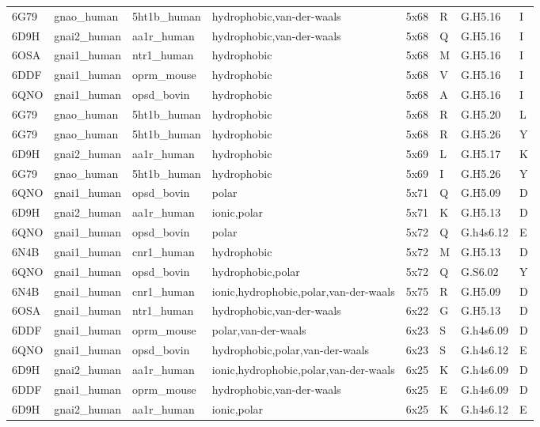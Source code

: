 \begin{landscape}
\begin{longtable}{llllllll}
6G79 & gnao\_human & 5ht1b\_human & hydrophobic,van-der-waals & 5x68 & R & G.H5.16 & I\\
6D9H & gnai2\_human & aa1r\_human & hydrophobic,van-der-waals & 5x68 & Q & G.H5.16 & I\\
\addlinespace
6OSA & gnai1\_human & ntr1\_human & hydrophobic & 5x68 & M & G.H5.16 & I\\
6DDF & gnai1\_human & oprm\_mouse & hydrophobic & 5x68 & V & G.H5.16 & I\\
6QNO & gnai1\_human & opsd\_bovin & hydrophobic & 5x68 & A & G.H5.16 & I\\
6G79 & gnao\_human & 5ht1b\_human & hydrophobic & 5x68 & R & G.H5.20 & L\\
6G79 & gnao\_human & 5ht1b\_human & hydrophobic & 5x68 & R & G.H5.26 & Y\\
\addlinespace
6D9H & gnai2\_human & aa1r\_human & hydrophobic & 5x69 & L & G.H5.17 & K\\
6G79 & gnao\_human & 5ht1b\_human & hydrophobic & 5x69 & I & G.H5.26 & Y\\
6QNO & gnai1\_human & opsd\_bovin & polar & 5x71 & Q & G.H5.09 & D\\
6D9H & gnai2\_human & aa1r\_human & ionic,polar & 5x71 & K & G.H5.13 & D\\
6QNO & gnai1\_human & opsd\_bovin & polar & 5x72 & Q & G.h4s6.12 & E\\
\addlinespace
6N4B & gnai1\_human & cnr1\_human & hydrophobic & 5x72 & M & G.H5.13 & D\\
6QNO & gnai1\_human & opsd\_bovin & hydrophobic,polar & 5x72 & Q & G.S6.02 & Y\\
6N4B & gnai1\_human & cnr1\_human & ionic,hydrophobic,polar,van-der-waals & 5x75 & R & G.H5.09 & D\\
6OSA & gnai1\_human & ntr1\_human & hydrophobic,van-der-waals & 6x22 & G & G.H5.13 & D\\
6DDF & gnai1\_human & oprm\_mouse & polar,van-der-waals & 6x23 & S & G.h4s6.09 & D\\
\addlinespace
6QNO & gnai1\_human & opsd\_bovin & hydrophobic,polar,van-der-waals & 6x23 & S & G.h4s6.12 & E\\
6D9H & gnai2\_human & aa1r\_human & ionic,hydrophobic,polar,van-der-waals & 6x25 & K & G.h4s6.09 & D\\
6DDF & gnai1\_human & oprm\_mouse & hydrophobic,van-der-waals & 6x25 & E & G.h4s6.09 & D\\
6D9H & gnai2\_human & aa1r\_human & ionic,polar & 6x25 & K & G.h4s6.12 & E\\

\end{longtable}
\end{landscape}
